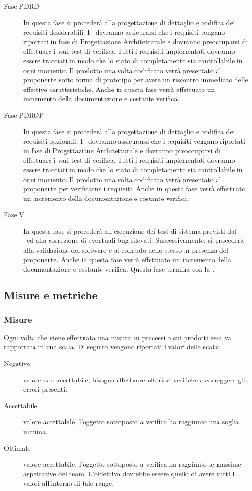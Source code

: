 \documentclass[../PianoDiQualifica.tex]{subfiles}
\begin{document}
\begin{description}
		 	\item[Fase PDRD] In questa fase si procederà alla progettazione di dettaglio e codifica dei requisiti desiderabili. I \verificatori\ dovranno assicurarsi che i requisiti vengano riportati in fase di Progettazione Architetturale e dovranno preoccuparsi di effettuare i vari test di verifica. Tutti i requisiti implementati dovranno essere tracciati in modo che lo stato di completamento sia controllabile in ogni momento. Il prodotto una volta codificato verrà presentato al proponente sotto forma di prototipo per avere un riscontro immediato delle effettive caratteristiche. Anche in questa fase verrà effettuato un incremento della documentazione e costante verifica.
		 	\item[Fase PDROP] In questa fase si procederà alla progettazione di dettaglio e codifica dei requisiti opzionali. I \verificatori\ dovranno assicurarsi che i requisiti vengano riportati in fase di Progettazione Architetturale e dovranno preoccuparsi di effettuare i vari test di verifica. Tutti i requisiti implementati dovranno essere tracciati in modo che lo stato di completamento sia controllabile in ogni momento. Il prodotto una volta codificato verrà presentato al proponente per verificarne i requisiti. Anche in questa fase verrà effettuato un incremento della documentazione e costante verifica.
			\item[Fase V] In questa fase si procederà all'esecuzione dei test di sistema previsti dal \pianodiqualifica\ ed alla correzione di eventuali bug rilevati. Successivamente, si procederà alla validazione del software e al collaudo dello stesso in presenza del proponente. Anche in questa fase verrà effettuato un incremento della documentazione e costante verifica. Questa fase termina con la \revisionediaccettazione.
		\end{description}
		\subsection{Misure e metriche}
			\subsubsection{Misure}
			Ogni volta che viene effettuata una misura su processi o sui prodotti essa va rapportata in una scala. Di seguito vengono riportati i valori della scala:
			\begin{description}
			\item[Negativo] valore non accettabile, bisogna effettuare ulteriori verifiche e correggere gli errori presenti.
			\item[Accettabile] valore accettabile, l'oggetto sottoposto a verifica ha raggiunto una soglia minima.
			\item[Ottimale] valore accettabile, l'oggetto sottoposto a verifica ha raggiunto le massime aspettative del team. L'obiettivo dovrebbe essere quello di avere tutti i valori all'interno di tale range. 
			\end{description}
\end{document}
